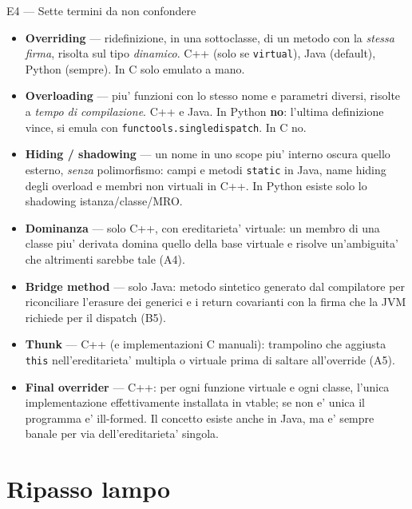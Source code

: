 \documentclass{report}
\newcommand{\code}[1]{\texttt{\small #1}}
\begin{document}
\begin{soluzione}{E4 --- Sette termini da non confondere}
\label{sol:E4}
\begin{itemize}
    \item \textbf{Overriding} --- ridefinizione, in una sottoclasse, di un
          metodo con la \emph{stessa firma}, risolta sul tipo \emph{dinamico}.
          C++ (solo se \code{virtual}), Java (default), Python (sempre). In C
          solo emulato a mano.
    \item \textbf{Overloading} --- piu' funzioni con lo stesso nome e parametri
          diversi, risolte a \emph{tempo di compilazione}. C++ e Java. In Python
          \textbf{no}: l'ultima definizione vince, si emula con
          \code{functools.singledispatch}. In C no.
    \item \textbf{Hiding / shadowing} --- un nome in uno scope piu' interno
          oscura quello esterno, \emph{senza} polimorfismo: campi e metodi
          \code{static} in Java, name hiding degli overload e membri non
          virtuali in C++. In Python esiste solo lo shadowing
          istanza/classe/MRO.
    \item \textbf{Dominanza} --- solo C++, con ereditarieta' virtuale: un membro
          di una classe piu' derivata domina quello della base virtuale e
          risolve un'ambiguita' che altrimenti sarebbe tale (A4).
    \item \textbf{Bridge method} --- solo Java: metodo sintetico generato dal
          compilatore per riconciliare l'erasure dei generici e i return
          covarianti con la firma che la JVM richiede per il dispatch (B5).
    \item \textbf{Thunk} --- C++ (e implementazioni C manuali): trampolino che
          aggiusta \code{this} nell'ereditarieta' multipla o virtuale prima di
          saltare all'override (A5).
    \item \textbf{Final overrider} --- C++: per ogni funzione virtuale e ogni
          classe, l'unica implementazione effettivamente installata in vtable;
          se non e' unica il programma e' ill-formed. Il concetto esiste anche
          in Java, ma e' sempre banale per via dell'ereditarieta' singola.
\end{itemize}
\end{soluzione}

\chapter{Ripasso lampo}
\end{document}
